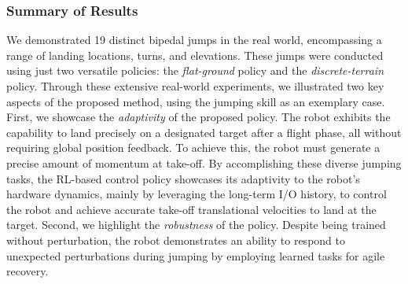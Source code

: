 \subsubsection{Summary of Results}
We demonstrated 19 distinct bipedal jumps in the real world, encompassing a range of landing locations, turns, and elevations. 
These jumps were conducted using just two versatile policies: the \emph{flat-ground} policy and the \emph{discrete-terrain} policy.
Through these extensive real-world experiments, we illustrated two key aspects of the proposed method, using the jumping skill as an exemplary case. 
First, we showcase the \emph{adaptivity} of the proposed policy. 
The robot exhibits the capability to land precisely on a designated target after a flight phase, all without requiring global position feedback. 
To achieve this, the robot must generate a precise amount of momentum at take-off. 
By accomplishing these diverse jumping tasks, the RL-based control policy showcases its adaptivity to the robot's hardware dynamics, mainly by leveraging the long-term I/O history, to control the robot and achieve accurate take-off translational velocities to land at the target.
Second, we highlight the \emph{robustness} of the policy. 
Despite being trained without perturbation, the robot demonstrates an ability to respond to unexpected perturbations during jumping by employing learned tasks for agile recovery.